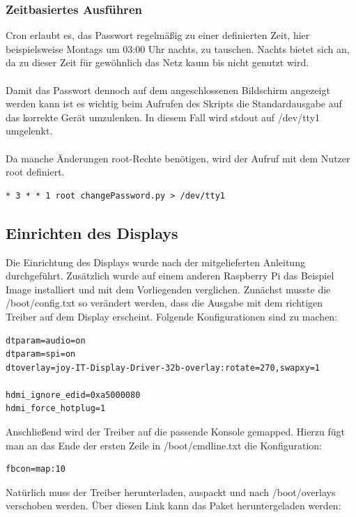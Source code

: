 \documentclass[a4paper,11pt,singlespacing]{article}
\begin{document}
    		\subsubsection{Zeitbasiertes Ausführen}
    			Cron erlaubt es, das Passwort regelmäßig zu einer definierten Zeit, hier beispielsweise Montags um 03:00 Uhr nachts, zu tauschen. Nachts bietet sich an, da zu dieser Zeit für gewöhnlich das Netz kaum bis nicht genutzt wird. \\ \\
    			Damit das Passwort dennoch auf dem angeschlossenen Bildschirm angezeigt werden kann ist es wichtig beim Aufrufen des Skripts die Standardausgabe auf das korrekte Gerät umzulenken. In diesem Fall wird stdout auf /dev/tty1 umgelenkt. \\ \\
    			Da manche Änderungen root-Rechte benötigen, wird der Aufruf mit dem Nutzer root definiert.
    			\begin{lstlisting}
* 3 * * 1 root changePassword.py > /dev/tty1
    			\end{lstlisting}
    		
    \subsection{Einrichten des Displays}
    		Die Einrichtung des Displays wurde nach der mitgelieferten Anleitung durchgeführt. \cite{Quote_display_manual} Zusätzlich wurde auf einem anderen Raspberry Pi das Beispiel Image installiert und mit dem Vorliegenden verglichen. Zunächst musste die /boot/config.txt so verändert werden, dass die Ausgabe mit dem richtigen Treiber auf dem Display erscheint. Folgende Konfigurationen sind zu machen:
    		\begin{lstlisting}
dtparam=audio=on
dtparam=spi=on
dtoverlay=joy-IT-Display-Driver-32b-overlay:rotate=270,swapxy=1

hdmi_ignore_edid=0xa5000080
hdmi_force_hotplug=1
    		\end{lstlisting}
    		
    		Anschließend wird der Treiber auf die passende Konsole gemapped. Hierzu fügt man an das Ende der ersten Zeile in /boot/cmdline.txt die Konfiguration:
    		\begin{lstlisting}
fbcon=map:10
    		\end{lstlisting}

			Natürlich muss der Treiber herunterladen, auspackt und nach /boot/overlays verschoben werden. Über diesen Link kann das Paket heruntergeladen werden:\\
			
\end{document}
